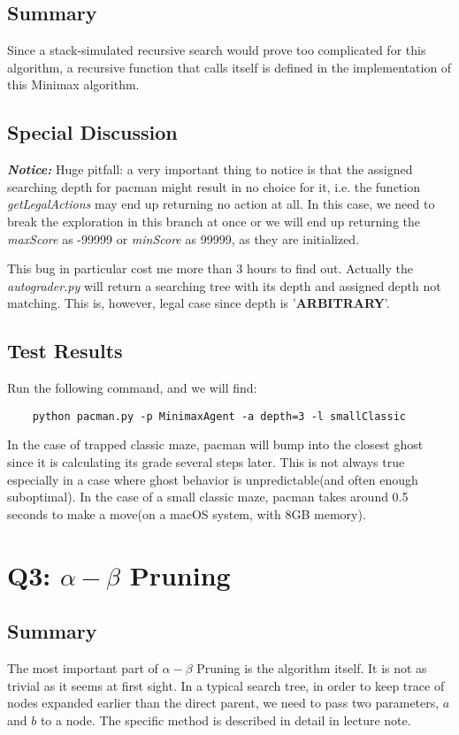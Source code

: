\documentclass{article}
\begin{document}
  \subsection{Summary}
  Since a stack-simulated recursive search would prove too complicated for this algorithm, a recursive function that calls itself is defined in the implementation of this Minimax algorithm.
  \subsection{Special Discussion}
  \textbf{\emph{Notice:}} Huge pitfall: a very important thing to notice is that the assigned searching depth for pacman might result in no choice for it, i.e. the function \textit{getLegalActions} may end up returning no action at all. In this case, we need to break the exploration in this branch at once or we will end up returning the \textit{maxScore} as -99999 or \textit{minScore} as 99999, as they are initialized.\par
  This bug in particular cost me more than 3 hours to find out. Actually the \textit{autograder.py} will return a searching tree with its depth and assigned depth not matching. This is, however, legal case since depth is '\textbf{ARBITRARY}'.
  \subsection{Test Results} 
  Run the following command, and we will find:
\begin{verbatim}
    python pacman.py -p MinimaxAgent -a depth=3 -l smallClassic
\end{verbatim}\par
  In the case of trapped classic maze, pacman will bump into the closest ghost since it is calculating its grade several steps later. This is not always true especially in a case where ghost behavior is unpredictable(and often enough suboptimal).
  In the case of a small classic maze, pacman takes around 0.5 seconds to make a move(on a macOS system, with 8GB memory).

\section{Q3: $\alpha-\beta$ Pruning}
  \subsection{Summary}
  The most important part of $\alpha-\beta$ Pruning is the algorithm itself. It is not as trivial as it seems at first sight. In a typical search tree, in order to keep trace of nodes expanded earlier than the direct parent, we need to pass two parameters, $a$ and $b$ to a node. The specific method is described in detail in lecture note.
\end{document}
